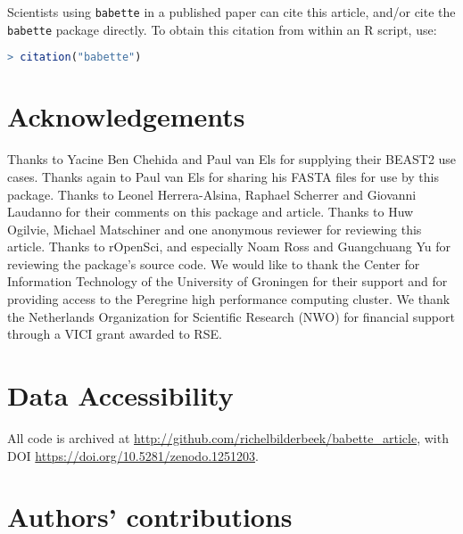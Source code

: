 Scientists using \verb;babette; in a published paper can cite this
article, and/or cite the \verb;babette; package 
directly. To obtain this citation from within an R script, use:

\begin{lstlisting}[language=R]
> citation("babette")
\end{lstlisting}

\section{Acknowledgements}

Thanks to Yacine Ben Chehida and Paul van Els for supplying their 
BEAST2 use cases. Thanks again to Paul van Els for sharing his FASTA files 
for use by this package. Thanks to Leonel Herrera-Alsina, Raphael Scherrer 
and Giovanni Laudanno for their comments on this package and article.
Thanks to Huw Ogilvie, Michael Matschiner and one anonymous reviewer for reviewing this article.
Thanks to rOpenSci, and especially Noam Ross and Guangchuang Yu for reviewing the package's source code.
We would like to thank the Center for Information Technology of the University 
of Groningen for their support and for providing access to the Peregrine 
high performance computing cluster. We thank the Netherlands 
Organization for Scientific Research (NWO) for financial support 
through a VICI grant awarded to RSE.

\section{Data Accessibility}

All code is archived at \url{http://github.com/richelbilderbeek/babette_article},
with DOI \url{https://doi.org/10.5281/zenodo.1251203}.

\section{Authors' contributions}

